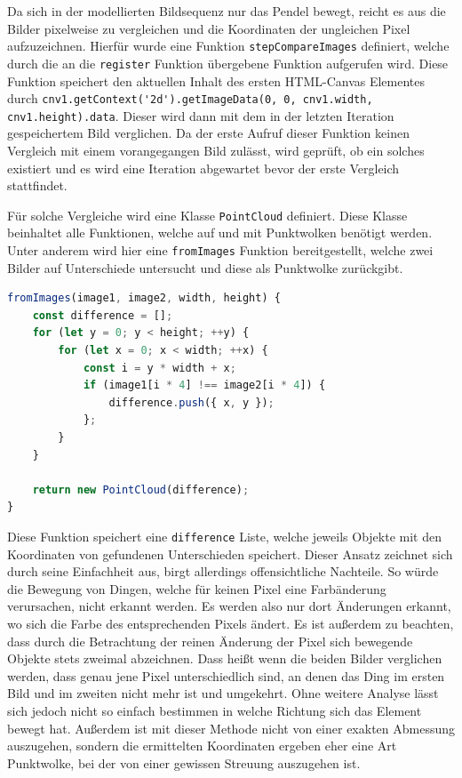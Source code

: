 Da sich in der modellierten Bildsequenz nur das Pendel bewegt, reicht es aus die Bilder pixelweise zu vergleichen und die Koordinaten der ungleichen Pixel aufzuzeichnen.
Hierfür wurde eine Funktion \lstinline{stepCompareImages} definiert, welche durch die an die \lstinline{register} Funktion übergebene Funktion aufgerufen wird.
Diese Funktion speichert den aktuellen Inhalt des ersten HTML-Canvas Elementes durch \lstinline{cnv1.getContext('2d').getImageData(0, 0, cnv1.width, cnv1.height).data}.
Dieser wird dann mit dem in der letzten Iteration gespeichertem Bild verglichen.
Da der erste Aufruf dieser Funktion keinen Vergleich mit einem vorangegangen Bild zulässt, wird geprüft, ob ein solches existiert und es wird eine Iteration abgewartet bevor der erste Vergleich stattfindet.

Für solche Vergleiche wird eine Klasse \lstinline{PointCloud} definiert.
Diese Klasse beinhaltet alle Funktionen, welche auf und mit Punktwolken benötigt werden.
Unter anderem wird hier eine \lstinline{fromImages} Funktion bereitgestellt, welche zwei Bilder auf Unterschiede untersucht und diese als Punktwolke zurückgibt.

\begin{lstlisting}[language=JavaScript, caption={Definition der \lstinline{fromImages} Funktion, welche eine statische Funktion der \lstinline{PointCloud} Klasse darstellt.}, label={lst:PointCloud}]
fromImages(image1, image2, width, height) {
    const difference = [];
    for (let y = 0; y < height; ++y) {
        for (let x = 0; x < width; ++x) {
            const i = y * width + x;
            if (image1[i * 4] !== image2[i * 4]) {
                difference.push({ x, y });
            };
        }
    }

    return new PointCloud(difference);
}
\end{lstlisting}

Diese Funktion speichert eine \lstinline{difference} Liste, welche jeweils Objekte mit den Koordinaten von gefundenen Unterschieden speichert.
Dieser Ansatz zeichnet sich durch seine Einfachheit aus, birgt allerdings offensichtliche Nachteile.
So würde die Bewegung von Dingen, welche für keinen Pixel eine Farbänderung verursachen, nicht erkannt werden.
Es werden also nur dort Änderungen erkannt, wo sich die Farbe des entsprechenden Pixels ändert.
Es ist au{\ss}erdem zu beachten, dass durch die Betrachtung der reinen Änderung der Pixel sich bewegende Objekte stets zweimal abzeichnen.
Dass hei{\ss}t wenn die beiden Bilder verglichen werden, dass genau jene Pixel unterschiedlich sind, an denen das Ding im ersten Bild und im zweiten nicht mehr ist und umgekehrt.
Ohne weitere Analyse lässt sich jedoch nicht so einfach bestimmen in welche Richtung sich das Element bewegt hat.
Au{\ss}erdem ist mit dieser Methode nicht von einer exakten Abmessung auszugehen, sondern die ermittelten Koordinaten ergeben eher eine Art Punktwolke, bei der von einer gewissen Streuung auszugehen ist.

